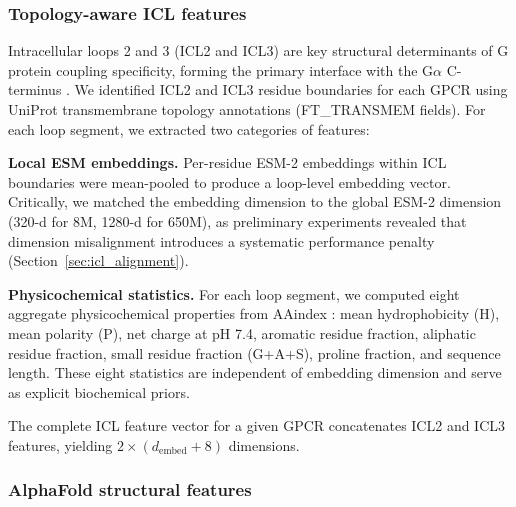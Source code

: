 \documentclass[11pt,a4paper]{article}
\begin{document}
\subsubsection{Topology-aware ICL features}

Intracellular loops 2 and 3 (ICL2 and ICL3) are key structural determinants of G protein coupling specificity, forming the primary interface with the G$\alpha$ C-terminus \cite{flock2023selectivity, rasmussen2011crystal}. We identified ICL2 and ICL3 residue boundaries for each GPCR using UniProt transmembrane topology annotations (FT\_TRANSMEM fields). For each loop segment, we extracted two categories of features:

\textbf{Local ESM embeddings.} Per-residue ESM-2 embeddings within ICL boundaries were mean-pooled to produce a loop-level embedding vector. Critically, we matched the embedding dimension to the global ESM-2 dimension (320-d for 8M, 1280-d for 650M), as preliminary experiments revealed that dimension misalignment introduces a systematic performance penalty (Section~\ref{sec:icl_alignment}).

\textbf{Physicochemical statistics.} For each loop segment, we computed eight aggregate physicochemical properties from AAindex \cite{kawashima2008aaindex}: mean hydrophobicity (H), mean polarity (P), net charge at pH 7.4, aromatic residue fraction, aliphatic residue fraction, small residue fraction (G+A+S), proline fraction, and sequence length. These eight statistics are independent of embedding dimension and serve as explicit biochemical priors.

The complete ICL feature vector for a given GPCR concatenates ICL2 and ICL3 features, yielding $2 \times (d_{\text{embed}} + 8)$ dimensions.

\subsubsection{AlphaFold structural features}
\end{document}
